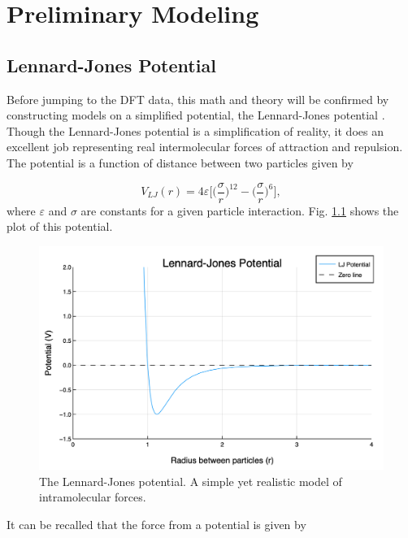 \chapter{Preliminary Modeling}\label{Sect:modelPrep}

\section{Lennard-Jones Potential}\label{Sect:LJPotential}
Before jumping to the DFT data, this math and theory will be confirmed by constructing models on a simplified potential, the Lennard-Jones potential \cite{LJ-potential}. Though the Lennard-Jones potential is a simplification of reality, it does an excellent job representing real intermolecular forces of attraction and repulsion. The potential is a function of distance between two particles given by

\begin{equation} \label{eq:LJ}
V_{LJ}(r) = 4\varepsilon \bigg[\Big(\frac{\sigma}{r}\Big)^{12} - \Big(\frac{\sigma}{r}\Big)^6\bigg],
\end{equation}
where $\varepsilon$ and $\sigma$ are constants for a given particle interaction. Fig. \ref{fig:LJ} shows the plot of this potential.

\begin{figure}%
\centering
\includegraphics[scale = 0.5]{Figures/LJPotential}
\caption{The Lennard-Jones potential. A simple yet realistic model of intramolecular forces.
\label{fig:LJ}} 
\end{figure}

\par It can be recalled that the force from a potential is given by

